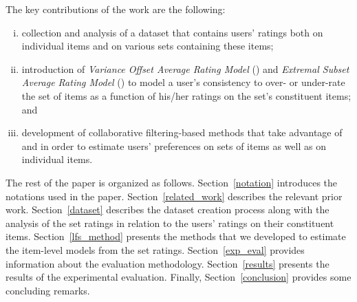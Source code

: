The key contributions of the work are the following:
\begin{enumerate}[(i)]
\item collection and analysis of a dataset that contains users' ratings both on
individual items and on various sets containing these items;
%
\item introduction of \emph{Variance Offset Average Rating Model} (\VO) and
\emph{Extremal Subset Average Rating Model} (\ES) to
model a user's consistency to over- or under-rate the set of items as a function of his/her ratings on the set's constituent items; and
%
\item development of collaborative filtering-based methods that take
advantage of \VO and \ES in order to estimate users' preferences on sets of items as well as
on individual items.
\end{enumerate}


The rest of the paper is organized as follows. Section~\ref{notation} introduces the
notations used in the paper. Section~\ref{related_work} describes the relevant
prior work. Section~\ref{dataset} describes the dataset creation process
along with the analysis of the set ratings in relation to the users' ratings on
their constituent items. 
Section~\ref{lfs_method} presents the methods that we developed to estimate the
item-level models from the set ratings. 
Section~\ref{exp_eval} provides information about the evaluation methodology. 
Section~\ref{results} presents the results of the experimental evaluation. Finally, 
Section~\ref{conclusion} provides some concluding remarks.



